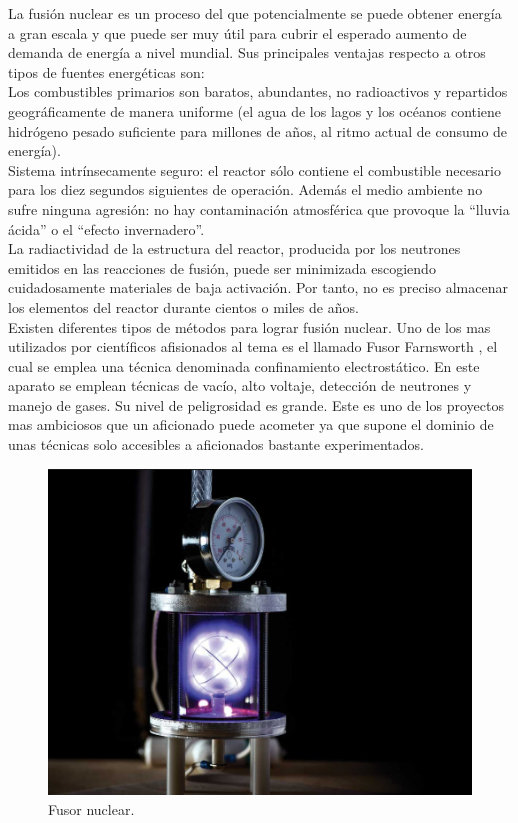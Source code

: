 La fusión nuclear es un proceso del que potencialmente se puede obtener energía a gran escala y que puede ser muy útil para cubrir el esperado aumento de demanda de energía a nivel mundial. Sus principales ventajas respecto a otros tipos de fuentes energéticas son:\\

Los combustibles primarios son baratos, abundantes, no radioactivos y repartidos geográficamente de manera uniforme (el agua de los lagos y los océanos contiene hidrógeno pesado suficiente para millones de años, al ritmo actual de consumo de energía).\\

Sistema intrínsecamente seguro: el reactor sólo contiene el combustible necesario para los diez segundos siguientes de operación. Además el medio ambiente no sufre ninguna agresión: no hay contaminación atmosférica que provoque la “lluvia ácida” o el “efecto invernadero”.\\

La radiactividad de la estructura del reactor, producida por los neutrones emitidos en las reacciones de fusión, puede ser minimizada escogiendo cuidadosamente materiales de baja activación. Por tanto, no es preciso almacenar los elementos del reactor durante cientos o miles de años. \cite{fusion} \\

Existen diferentes tipos de métodos para lograr fusión nuclear. Uno de los mas utilizados por científicos afisionados al tema es el llamado Fusor Farnsworth \cite{fusor}, el cual se emplea una técnica denominada confinamiento electrostático. En este aparato se emplean técnicas de vacío, alto voltaje, detección de neutrones y manejo de gases. Su nivel de peligrosidad es grande. Este es uno de los proyectos mas ambiciosos que un aficionado puede acometer ya que supone el dominio de unas técnicas solo accesibles a aficionados bastante experimentados.


\begin{figure}[H]
\centering
\includegraphics[width=12cm]{capitulo3/figs/fusor.png}
\caption{ Fusor nuclear.}
\end{figure}

